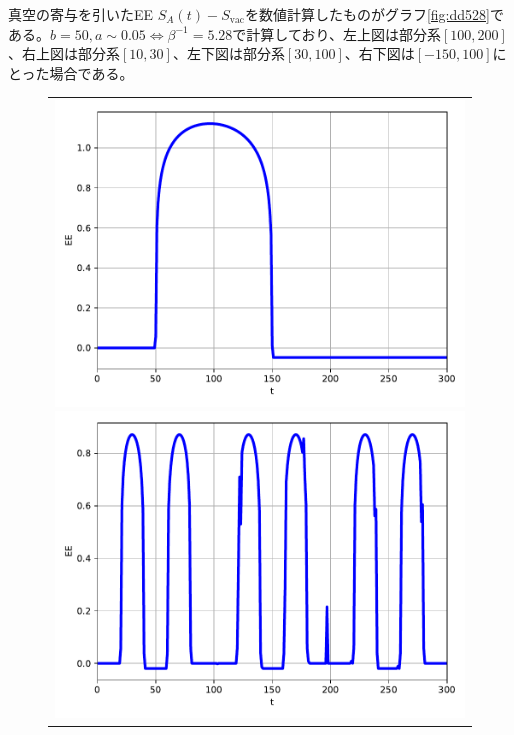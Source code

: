 真空の寄与を引いたEE $S_A(t)-S_\text{vac}$を数値計算したものがグラフ\ref{fig:dd528}である。$b=50,a\sim 0.05\iff \beta^{-1}=5.28$で計算しており、左上図は部分系$[100,200]$、右上図は部分系$[10,30]$、左下図は部分系$[30,100]$、右下図は$[-150,100]$にとった場合である。
\begin{figure}[H]
	\centering
	\begin{tabular}{c}
		\begin{minipage}{0.50\hsize}
			\centering
			\includegraphics[width=\linewidth]{dd528_100_200.pdf}
		\end{minipage}
		\begin{minipage}{0.50\hsize}
			\centering
			\includegraphics[width=\linewidth]{dd528_10_30.pdf}

\end{minipage}
\end{tabular}
\end{figure}
